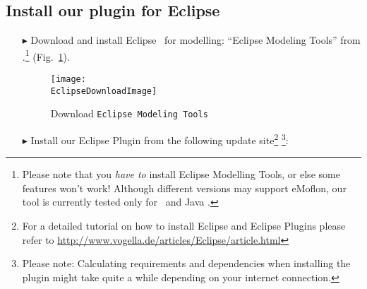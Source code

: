 \newpage
\genHeader
\hypertarget{installPlugin common}{} 
\subsection{Install our plugin for Eclipse}
 
\vspace{0.5cm}
 
\begin{itemize}
  
\item[$\blacktriangleright$] Download and install Eclipse \EclipseVersion~for modelling: ``Eclipse Modeling Tools'' from \EclipseDownloadLink.\footnote{Please
note that you \emph{have to} install Eclipse Modelling Tools, or else some features won't work! Although different versions may support eMoflon, our tool is
currently tested only for \EclipseVersion~and Java \JavaVersion.} (Fig.~\ref{fig:eclipseDownload}).

\begin{figure}[htbp]
	\centering
  	\texttt{[image: \\EclipseDownloadImage]}
	\caption{Download \texttt{Eclipse Modeling Tools}}
	\label{fig:eclipseDownload}
\end{figure}

\vspace{0.5cm}

\item[$\blacktriangleright$] Install our Eclipse Plugin from the following update site\footnote{For a detailed tutorial on how to install Eclipse and Eclipse
Plugins please refer to \url{http://www.vogella.de/articles/Eclipse/article.html}} \footnote{Please note: Calculating requirements and dependencies when
installing the plugin might take quite a while depending on your internet connection.}: \eMoflonUpdateSite


\end{itemize}
